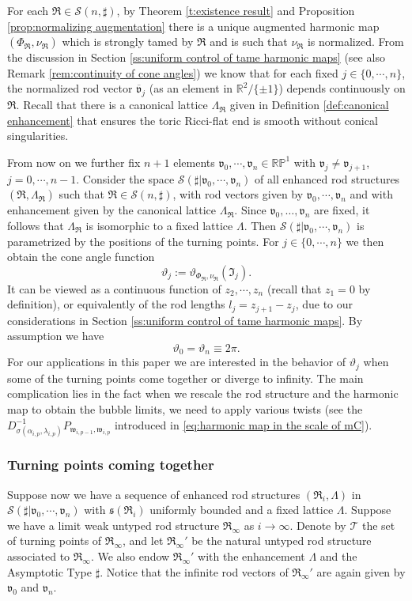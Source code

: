 \documentclass[a4paper,11pt]{amsart}
\theoremstyle{definition}
\numberwithin{equation}{section}
\newcommand{\R}{\mathbb{R}}
\newcommand{\dP}{\mathbb{P}}
\newcommand{\mv} {\mathfrak v}
\newcommand{\mw} {\mathfrak w}
\newcommand{\ms} {\mathfrak s}
\newcommand{\mI} {\mathfrak I}
\newcommand{\mR} {\mathfrak R}
\begin{document}
For each $\mR\in \mathcal S(n, \sharp)$, by Theorem \ref{t:existence result} and Proposition \ref{prop:normalizing augmentation} there is a unique augmented harmonic map $(\Phi_{\mR}, \nu_{\mR})$ which  is strongly tamed by $\mR$ and is  such that $\nu_{\mR}$ is normalized. From the discussion in Section \ref{ss:uniform control of tame harmonic maps} (see also Remark \ref{rem:continuity of cone angles})  we know that for each fixed $j\in\{0, \cdots, n\}$, the normalized rod vector $\overline{\mv}_j$ (as an element in $\R^2/\{\pm 1\}$) depends continuously on $\mR$. Recall that there is a canonical lattice $\Lambda_{\mR}$ given in Definition \ref{def:canonical enhancement}  that ensures the toric Ricci-flat end is smooth without conical singularities.


From now on we further fix $n+1$ elements  $\mv_0, \cdots, \mv_n\in \R\dP^1$ with $\mv_{j}\neq \mv_{j+1}$, $j=0, \cdots, n-1$. Consider the space $\mathcal S(\sharp| \mv_0, \cdots, \mv_n)$  of all enhanced rod structures $(\mR, \Lambda_{\mR})$ such that $\mR\in\mathcal S(n, \sharp)$, with rod vectors given by $\mv_0, \cdots, \mv_n$ and with enhancement  given by the canonical lattice $\Lambda_{\mR}$. Since $\mv_0,\ldots,\mv_n$ are fixed, it follows that  $\Lambda_{\mR}$ is isomorphic to a fixed lattice $\Lambda$. Then $\mathcal S(\sharp| \mv_0, \cdots, \mv_n)$ is parametrized by the positions of the turning points. For $j\in \{0, \cdots, n\}$ we then obtain the cone angle function $$\vartheta_j:=\vartheta_{\Phi_{\mR}, \nu_{\mR}}(\mI_j).$$ It can be viewed as a continuous function of  $z_2, \cdots, z_n$ (recall that $z_1=0$ by definition), or equivalently of the rod lengths $l_j=z_{j+1}-z_{j}$, due to our considerations in Section \ref{ss:uniform control of tame harmonic maps}. By assumption we have $$\vartheta_0=\vartheta_n\equiv 2\pi.$$ For our applications in this paper we are interested in the behavior of $\vartheta_j$ when some of  the turning points come together or diverge to infinity. The main complication lies in the fact when we rescale the rod structure and the harmonic map to obtain the bubble limits, we need to apply various twists (see the $D_{\sigma(\alpha_{i, p}, \lambda_{i, p})}^{-1}P_{\mw_{i,p-1},\mw_{i,p}}$ introduced in \eqref{eq:harmonic map in the scale of mC}). 

\subsubsection{Turning points coming together}\label{sss:limit of cone angles when turning points come together}
Suppose now we have a sequence of enhanced rod structures $(\mR_i, \Lambda)$ in $\mathcal S(\sharp| \mv_0, \cdots, \mv_n)$ with $\ms(\mR_i)$ uniformly bounded and a fixed lattice $\Lambda$. Suppose we have a limit weak untyped rod structure $\mR_\infty$ as $i\rightarrow\infty$. Denote by $\mathcal T$ the set of turning points of $\mR_\infty$, and let $\mR_\infty'$ be the natural untyped rod structure associated to $\mR_\infty$. We also endow $\mR_\infty'$ with the enhancement $\Lambda$ and the Asymptotic Type $\sharp$. Notice that the infinite rod vectors of $\mR_{\infty}'$ are again given by $\mv_0$ and $\mv_n.$
\end{document}
